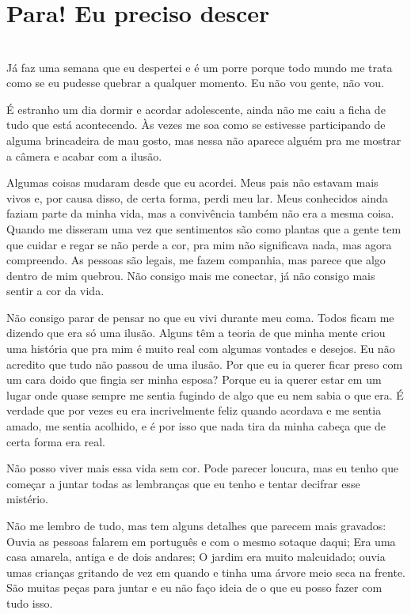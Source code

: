 \newpage

\ifdefined\useChapters
\chapter{Para! Eu preciso descer}
\else
\chapter{}
\fi

Já faz uma semana que eu despertei e é um porre porque todo mundo me trata como se eu pudesse quebrar a qualquer momento. Eu não vou gente, não vou.

É estranho um dia dormir e acordar adolescente, ainda não me caiu a ficha de tudo que está acontecendo. Às vezes me soa como se estivesse participando de alguma brincadeira de mau gosto, mas nessa não aparece alguém pra me mostrar a câmera e acabar com a ilusão.

Algumas coisas mudaram desde que eu acordei. Meus pais não estavam mais vivos e, por causa disso, de certa forma, perdi meu lar. Meus conhecidos ainda faziam parte da minha vida, mas a convivência também não era a mesma coisa. Quando me disseram uma vez que sentimentos são como plantas que a gente tem que cuidar e regar se não perde a cor, pra mim não significava nada, mas agora compreendo. As pessoas são legais, me fazem companhia, mas parece que algo dentro de mim quebrou. Não consigo mais me conectar, já não consigo mais sentir a cor da vida.

Não consigo parar de pensar no que eu vivi durante meu coma. Todos ficam me dizendo que era só uma ilusão. Alguns têm a teoria de que minha mente criou uma história que pra mim é muito real com algumas vontades e desejos. Eu não acredito que tudo não passou de uma ilusão. Por que eu ia querer ficar preso com um cara doido que fingia ser minha esposa? Porque eu ia querer estar em um lugar onde quase sempre me sentia fugindo de algo que eu nem sabia o que era. É verdade que por vezes eu era incrivelmente feliz quando acordava e me sentia amado, me sentia acolhido, e é por isso que nada tira da minha cabeça que de certa forma era real.

Não posso viver mais essa vida sem cor. Pode parecer loucura, mas eu tenho que começar a juntar todas as lembranças que eu tenho e tentar decifrar esse mistério.

Não me lembro de tudo, mas tem alguns detalhes que parecem mais gravados: Ouvia as pessoas falarem em português e com o mesmo sotaque daqui; Era uma casa amarela, antiga e de dois andares; O jardim era muito malcuidado; ouvia umas crianças gritando de vez em quando e tinha uma árvore meio seca na frente. São muitas peças para juntar e eu não faço ideia de o que eu posso fazer com tudo isso.

